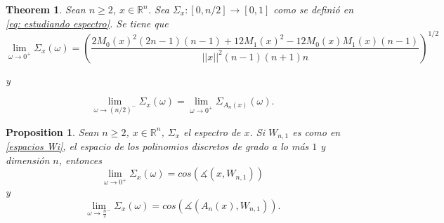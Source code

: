 \documentclass[]{beamer}
\newtheorem{teo}{\bf Theorem}
\newtheorem{prop}{\bf Proposition}
\theoremstyle{definition}
\newcommand{\IR}{\mathbb{R}}
\newcommand{\limite}[2]{\lim\limits_{#1}{#2}} %
\begin{document}
\begin{frame}
\begin{teo}
\label{teo: limite del espectro por cero}
Sean $n \geq 2$, $x \in \IR^{n}$.
Sea $\Sigma_{x}: [0, n/2] \rightarrow [0,1]$ 
como se definió en \eqref{eq: estudiando espectro}.
Se tiene que 
\begin{equation}
\label{eq: limite del espectro a cero}
\limite{\omega \rightarrow 0^{+}}{\Sigma_{x}(\omega)}
=
\left(
\frac{
2M_{0}(x)^{2}(2n-1)(n-1) + 12M_{1}(x)^{2} - 12M_{0}(x)M_{1}(x)(n-1)
}{
||x||^{2} (n-1)(n+1)n}
\right)^{1/2}
\end{equation}

y

\begin{equation}
\label{eq: limite del espectro a n medios}
\limite{\omega \rightarrow (n/2)^{-}}{\Sigma_{x}(\omega)}
= \limite{\omega \rightarrow 0^{+}}{\Sigma_{A_{n}(x)}(\omega)}.
\end{equation}
\end{teo}
\end{frame}

\begin{frame}
\begin{prop}
\label{prop: relacion limite cero con legendre}
Sean $n \geq 2$, $x \in \IR^{n}$,
$\Sigma_{x}$ el espectro de $x$.
Si $W_{n,1}$ es como en 
\eqref{espacios Wi}, el espacio
de los polinomios discretos de grado 
a lo más $1$ y dimensión $n$, entonces
\begin{equation}
\label{eq: limite por cero como angulo}
\limite{\omega \rightarrow 0^{+}}{
\Sigma_{x}(\omega)} = cos(\measuredangle(x, W_{n,1}))
\end{equation}
y
\begin{equation}
\label{eq: limite por cero como angulo}
\limite{\omega \rightarrow \frac{n}{2}^{-}}{
\Sigma_{x}(\omega)} = cos(\measuredangle(A_{n}(x), W_{n,1})).
\end{equation}
\end{prop}
\end{frame}
\end{document}
